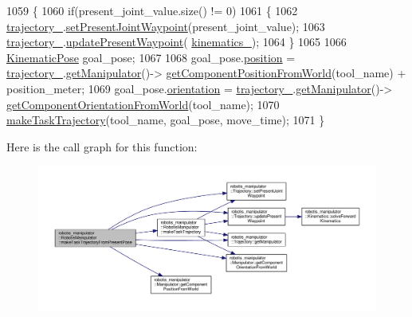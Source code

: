 \begin{DoxyCode}
1059 \{
1060   \textcolor{keywordflow}{if}(present\_joint\_value.size() != 0)
1061   \{
1062     \hyperlink{classrobotis__manipulator_1_1_robotis_manipulator_a992d2c7221bcaab8e9a688d12728d738}{trajectory\_}.\hyperlink{classrobotis__manipulator_1_1_trajectory_a58b1d4fb60f7e3ed9150d312766debc1}{setPresentJointWaypoint}(present\_joint\_value);
1063     \hyperlink{classrobotis__manipulator_1_1_robotis_manipulator_a992d2c7221bcaab8e9a688d12728d738}{trajectory\_}.\hyperlink{classrobotis__manipulator_1_1_trajectory_a05e95f1473723592130f63321664fb0c}{updatePresentWaypoint}(
      \hyperlink{classrobotis__manipulator_1_1_robotis_manipulator_a9a37fd068504dfe5fab346884790fc8f}{kinematics\_});
1064   \}
1065 
1066   \hyperlink{structrobotis__manipulator_1_1_kinematic_pose}{KinematicPose} goal\_pose;
1067 
1068   goal\_pose.\hyperlink{structrobotis__manipulator_1_1_kinematic_pose_a8700e7ae2388242cf540e884d52fd97a}{position} = \hyperlink{classrobotis__manipulator_1_1_robotis_manipulator_a992d2c7221bcaab8e9a688d12728d738}{trajectory\_}.\hyperlink{classrobotis__manipulator_1_1_trajectory_ae5276de42edf154de107c1f194f6b322}{getManipulator}()->
      \hyperlink{classrobotis__manipulator_1_1_manipulator_a04b2efdf66bc0e4bd04dc9aafd9f2d47}{getComponentPositionFromWorld}(tool\_name) + position\_meter;
1069   goal\_pose.\hyperlink{structrobotis__manipulator_1_1_kinematic_pose_a0506da3cc344d21656fdd1befdd7fa27}{orientation} = \hyperlink{classrobotis__manipulator_1_1_robotis_manipulator_a992d2c7221bcaab8e9a688d12728d738}{trajectory\_}.\hyperlink{classrobotis__manipulator_1_1_trajectory_ae5276de42edf154de107c1f194f6b322}{getManipulator}()->
      \hyperlink{classrobotis__manipulator_1_1_manipulator_a9228f1f4b7fd627da2a618b79b2f0c0b}{getComponentOrientationFromWorld}(tool\_name);
1070   \hyperlink{classrobotis__manipulator_1_1_robotis_manipulator_af99e51e771170748507ac7c750b515da}{makeTaskTrajectory}(tool\_name, goal\_pose, move\_time);
1071 \}
\end{DoxyCode}


Here is the call graph for this function\+:\nopagebreak
\begin{figure}[H]
\begin{center}
\leavevmode
\includegraphics[width=350pt]{classrobotis__manipulator_1_1_robotis_manipulator_a7c8796fb8230da8e8151abc96a276d2c_cgraph}
\end{center}
\end{figure}


